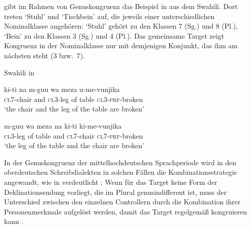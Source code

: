 \citet[169]{corbett2006} gibt im Rahmen von Genuskongruenz das Beispiel in
 aus dem Swahili. Dort treten  `Stuhl' und
 `Tischbein' auf, die jeweils einer unterschiedlichen
Nominalklasse angehören:  `Stuhl' gehört zu den Klassen 7 (Sg.) und 8
(Pl.),  `Bein' zu den Klassen 3 (Sg.) und 4 (Pl.). Das gemeinsame
Target  zeigt Kongruenz in der Nominalklasse nur mit
demjenigen Konjunkt, das ihm am nächsten steht (3 bzw.~7).

\begin{exe}
\ex \label{ex:cca}
	\langinfo%
		{Swahili}%
		{}%
		{\cite[45]{bokamba1985} in \cite[169]{corbett2006}}
	\begin{xlist}
	\ex \label{ex:cca_1}
		\gll ki-ti na m-guu wa meza u-me-vunjika \\
			\textsc{cl7}-chair and \textsc{cl3}-leg of table
			\textsc{cl3}-\textsc{prf}-broken \\
		\trans `the chair and the leg of the table are broken'

	\ex \label{ex:cca_2}
		\gll m-guu wa meza na ki-ti ki-me-vunjika \\
			\textsc{cl3}-leg of table and \textsc{cl7}-chair
			\textsc{cl7}-\textsc{prf}-broken \\
		\trans `the leg of the table and the chair are broken'
	\end{xlist}
\end{exe}

In der Genuskongruenz der mittelhochdeutschen
Sprachperiode wird in den oberdeutschen Schreibdialekten in
solchen Fällen die Kombinationsstrategie angewandt, wie in
 verdeutlicht
\autocites[vgl.][312]{grimm1890}[329]{grimm1898}[39--41]{behaghel1928}[187--189]{dal2014}:
Wenn für das Target keine Form der Deklinationsendung vorliegt, die im Plural
genusindifferent ist, muss der Unterschied zwischen den einzelnen Controllern
durch die Kombination ihrer Personenmerkmale aufgelöst werden, damit das Target
regelgemäß kongruieren kann
\autocites[vgl.][182--193]{corbett1983}[269--306]{corbett1991}[243--263]{corbett2006}.

